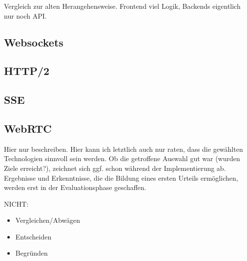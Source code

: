 Vergleich zur alten Herangehensweise. Frontend viel Logik, Backends
eigentlich nur noch API.

\subsection{Websockets}\label{websockets}

\subsection{HTTP/2}\label{http2}

\subsection{SSE}\label{sse}

\subsection{WebRTC}\label{webrtc}

Hier nur beschreiben. Hier kann ich letztlich auch nur raten, dass die
gewählten Technologien sinnvoll sein werden. Ob die getroffene Auswahl
gut war (wurden Ziele erreicht?), zeichnet sich ggf. schon während der
Implementierung ab. Ergebnisse und Erkenntnisse, die die Bildung eines
ersten Urteils ermöglichen, werden erst in der Evaluationsphase
geschaffen.

NICHT:

\begin{itemize}
\tightlist
\item
  Vergleichen/Abwägen
\item
  Entscheiden
\item
  Begründen
\end{itemize}
